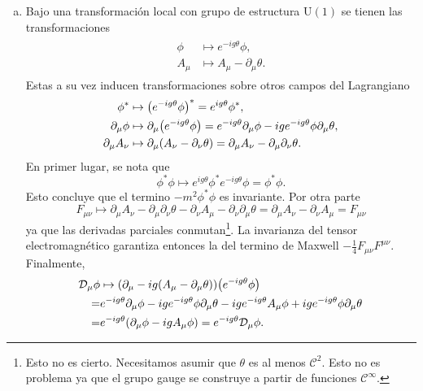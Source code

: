 \documentclass{article}
\begin{document}
\begin{enumerate}[1)]
\begin{enumerate}[a)]
\item Bajo una transformación local con grupo de estructura $\textrm{U}(1)$ se tienen las transformaciones
\begin{align}
\begin{split}
\phi&\mapsto e^{-ig\theta}\phi,\\
A_\mu&\mapsto A_\mu-\partial_\mu\theta.
\end{split}
\end{align}
Estas a su vez inducen transformaciones sobre otros campos del Lagrangiano
\begin{align}
\begin{split}
\phi^*&\mapsto\qty(e^{-ig\theta}\phi)^*=e^{ig\theta}\phi^*,\\
\partial_\mu\phi&\mapsto\partial_\mu\qty(e^{-ig\theta}\phi)=e^{-ig\theta}\partial_\mu\phi-ige^{-ig\theta}\phi\partial_\mu\theta,\\
\partial_\mu A_\nu&\mapsto \partial_\mu(A_\nu-\partial_\nu\theta)=\partial_\mu A_\nu-\partial_\mu\partial_\nu\theta.
\end{split}
\end{align}
En primer lugar, se nota que
\begin{equation}
\phi^*\phi\mapsto e^{ig\theta}\phi^*e^{-ig\theta}\phi=\phi^*\phi.
\end{equation}
Esto concluye que el termino $-m^2\phi^*\phi$ es invariante. Por otra parte
\begin{equation}
F_{\mu\nu}\mapsto\partial_\mu A_\nu-\partial_\mu\partial_\nu\theta-\partial_\nu A_\mu-\partial_\nu\partial_\mu\theta=\partial_\mu A_\nu-\partial_\nu A_\mu=F_{\mu\nu}
\end{equation}
ya que las derivadas parciales conmutan\footnote{Esto no es cierto. Necesitamos asumir que $\theta$ es al menos $\mathcal{C}^2$. Esto no es problema ya que el grupo gauge se construye a partir de funciones $\mathcal{C}^\infty$.}. La invarianza del tensor electromagnético garantiza entonces la del termino de Maxwell $-\frac{1}{4}F_{\mu\nu}F^{\mu\nu}$. Finalmente,
\begin{align}
\begin{split}
\mathcal{D}_\mu\phi&\mapsto(\partial_\mu-ig(A_\mu-\partial_\mu\theta))\qty(e^{-ig\theta}\phi)\\
=&e^{-ig\theta}\partial_\mu\phi-ige^{-ig\theta}\phi\partial_\mu\theta-ige^{-ig\theta}A_\mu\phi+ige^{-ig\theta}\phi\partial_\mu\theta\\
=&e^{-ig\theta}\qty(\partial_\mu\phi-igA_\mu\phi)=e^{-ig\theta}\mathcal{D}_\mu\phi.
\end{split}

\end{align}
\end{enumerate}
\end{enumerate}
\end{document}

